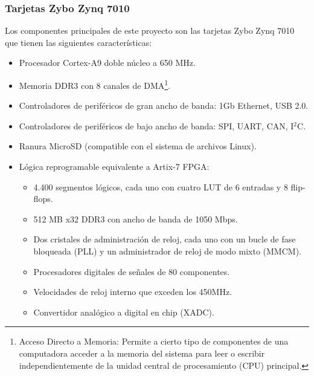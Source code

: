 \subsubsection{Tarjetas Zybo Zynq 7010}
Los componentes principales de este proyecto son las tarjetas Zybo Zynq 7010 que tienen las siguientes características:
\begin{itemize}
	\item Procesador Cortex-A9 doble núcleo a 650 MHz.
	\item Memoria DDR3 con 8 canales de DMA\footnote{Acceso Directo a Memoria: Permite a cierto tipo de componentes de una computadora acceder a la memoria del sistema para leer o escribir independientemente de la unidad central de procesamiento (CPU) principal.}.
	\item Controladores de periféricos de gran ancho de banda: 1Gb Ethernet, USB 2.0.
	\item Controladores de periféricos de bajo ancho de banda: SPI, UART, CAN, I$^2$C.
	\item Ranura MicroSD (compatible con el sistema de archivos Linux).
	\item Lógica reprogramable equivalente a Artix-7 FPGA:
	\begin{itemize}
		\item 4.400 segmentos lógicos, cada uno con cuatro LUT de 6 entradas y 8 flip-flops.
		\item 512 MB x32 DDR3 con ancho de banda de 1050 Mbps.
		\item Dos cristales de administración de reloj, cada uno con un bucle de fase bloqueada (PLL) y un administrador de reloj de modo mixto (MMCM).
		\item Procesadores digitales de señales de 80 componentes.
		\item Velocidades de reloj interno que exceden los 450MHz.
		\item Convertidor analógico a digital en chip (XADC).
	\end{itemize}
\end{itemize}

%

